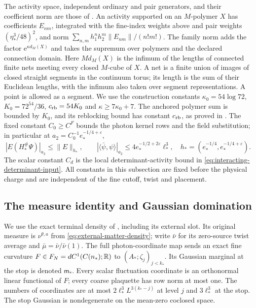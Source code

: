 The activity space, independent ordinary and pair generators, and
their coefficient norm are those of \cite[\S2.2]{NormalizedContraction}.
An activity supported on an $M$-polymer $X$ has coefficients
$E_{nm}$, integrated with the fine-index weights above and pair
weights $(\eta_*^3/48)^2$, and norm
$\sum_{n,m}h_1^nh_2^m\|E_{nm}\|/(n!m!)$.
The family norm adds the factor $\mathrm e^{\kappa d_M(X)}$ and takes
the supremum over polymers and the declared connection domain.
Here $Md_M(X)$ is the infimum of the lengths of connected finite
nets meeting every closed $M$-cube of $X$. A net is a finite union
of images of closed straight segments in the continuum torus;
its length is the sum of their Euclidean lengths, with the infimum
also taken over segment representations. A point is allowed as a
segment. We use the construction constants
$\kappa_0=54\log72$, $K_0=72^{54}/36$,
$c_{\rm rb}=54K_0$ and $\kappa\ge7\kappa_0+7$.
The anchored polymer sum is bounded by $K_0$, and its reblocking
bound has constant $c_{\rm rb}$, as proved in
\cite[Appendix~B, (79)--(83)]{NormalizedContraction}.
The fixed constant $C_0\ge C^F$ bounds the photon kernel rows and
the field substitution; in particular at
$a_2=C_0^{-1}e_*^{-1/4+\varepsilon}$,
\[
 |E(H_*^\#\Psi)|_{a_2}\le\|E\|_{h_*},\qquad
 |\langle\bar\psi,\psi\rangle|_{a_2}
          \le4e_*^{-1/2+2\varepsilon}\ell_*^3,
 \quad h_*=(e_*^{-1/4},e_*^{-1/4+\varepsilon}).
\]
The scalar constant $C_d$ is the local determinant-activity bound
in \eqref{eq:interacting-determinant-input}.
All constants in this subsection are fixed before the physical charge
and are independent of the fine cutoff, twist and placement.

\subsection{The measure identity and Gaussian domination}
We use the exact terminal density of
\cite[Theorem~B]{TerminalPressure}, including its external slot.
Its original measure is $\nu^{\theta,a}$ from
\eqref{eq:external-matter-density}; write $\bar\nu$ for its
zero-source twist average and $\bar\mu=\bar\nu/\bar\nu(1)$.
The full photon-coordinate map sends an exact fine curvature
$F\in F_N=dC^1(C(n_*);\mathbb R)$ to $(A_*;\zeta_j)_{j<k_*}$.
Its Gaussian marginal at the stop is denoted $\mathsf m_*$.
Every scalar fluctuation coordinate is an orthonormal linear
functional of $F$; every coarse plaquette has row norm at most one.
The numbers of coordinates are at most
$2\ell_*^3L^{3(k_*-j)}$ at level $j$ and $3\ell_*^3$ at the stop.
The stop Gaussian is nondegenerate on the mean-zero coclosed space.

